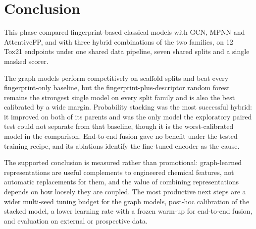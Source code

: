 \documentclass[conference]{IEEEtran}
\begin{document}
\section{Conclusion}
This phase compared fingerprint-based classical models with GCN, MPNN and AttentiveFP, and with
three hybrid combinations of the two families, on 12 Tox21 endpoints under one shared data
pipeline, seven shared splits and a single masked scorer.

The graph models perform competitively on scaffold splits and beat every fingerprint-only
baseline, but the fingerprint-plus-descriptor random forest remains the strongest single model
on every split family and is also the best calibrated by a wide margin. Probability stacking was
the most successful hybrid: it improved on both of its parents and was the only model the
exploratory paired test could not separate from that baseline, though it is the worst-calibrated
model in the comparison. End-to-end fusion gave no benefit under the tested training recipe, and
its ablations identify the fine-tuned encoder as the cause.

The supported conclusion is measured rather than promotional: graph-learned representations are
useful complements to engineered chemical features, not automatic replacements for them, and the
value of combining representations depends on how loosely they are coupled. The most productive
next steps are a wider multi-seed tuning budget for the graph models, post-hoc calibration of
the stacked model, a lower learning rate with a frozen warm-up for end-to-end fusion, and
evaluation on external or prospective data.




\appendix
\clearpage
\end{document}
